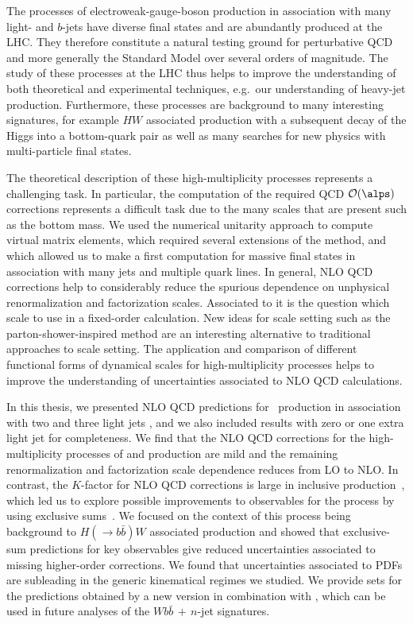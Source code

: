 The processes of electroweak-gauge-boson production in association
with many light- and $b$-jets have diverse final states and are abundantly produced at the LHC. They therefore constitute a
natural testing ground for perturbative QCD and more generally the Standard Model
over several orders of magnitude. The study of these processes at the
LHC thus helps to improve the understanding of both theoretical and experimental
techniques, e.g.~our understanding of heavy-jet production. Furthermore, these processes are background to many interesting signatures, for example $HW$ associated production with a subsequent decay of the Higgs into a
bottom-quark pair as well as many searches for new physics with
multi-particle final states. 

The theoretical description of these
high-multiplicity processes represents a
challenging task. In particular, the computation of the required QCD
$\mathcal{O}(\alps)$ corrections represents a difficult task due to the
many scales that are present such as the bottom mass. We used the numerical unitarity approach \cite{Bern:1994zx,Bern:1995db,Ossola:2006us,Ellis:2007br,Giele:2008ve,Ellis:2008ir} to compute virtual matrix elements, which required several extensions of the method, and which allowed us to make a first computation for massive final states in association with many jets and multiple quark lines. In general, NLO QCD corrections help to considerably reduce the spurious dependence on unphysical renormalization and factorization scales. Associated to it is the question which scale to use in a fixed-order calculation. New ideas for scale setting such as the parton-shower-inspired \MINLO{} method \cite{MINLO} are an interesting alternative to traditional approaches to scale setting. The application and comparison of different functional forms of dynamical scales for high-multiplicity processes helps to improve the understanding of uncertainties associated to NLO QCD calculations. 


In this thesis, we presented NLO QCD predictions for \Wbb~production
in association with two and three light jets \cite{wbbpaper}, and we also included results with zero or
one extra light jet for completeness. We find that the NLO QCD
corrections for the high-multiplicity processes of \Wbbnj[2]{}
and \Wbbnj[3]{} production are mild and the remaining renormalization and factorization scale 
dependence reduces from LO to NLO. In contrast, the $K$-factor for NLO QCD corrections is large in inclusive
\Wbb{}
production~\cite{Ellis:1998fv,FebresCordero:2006sj,Cordero:2009kv},
which led us to explore possible
improvements to observables for the \Wbb{} process by using exclusive
sums~\cite{ESums}. We focused on the context of this process being background to $H(\rightarrow b\bar b)W$ associated production and showed that exclusive-sum predictions for key observables give reduced uncertainties
associated to missing higher-order corrections. We
found that uncertainties associated to PDFs are subleading in the generic kinematical regimes we studied. We provide \ntuple{}
sets for the predictions obtained by a new \BlackHat{} version in
combination with \SHERPA{} \cite{Sherpa}, which can be used in future analyses of the 
$Wb\bar b\,\!+\!\,n$-jet
signatures.


